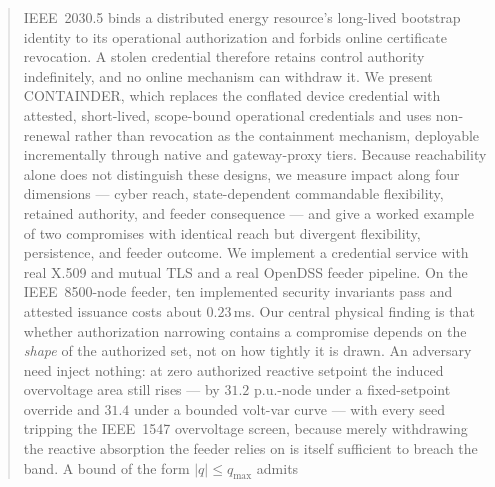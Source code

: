\begin{abstract}
IEEE~2030.5 binds a distributed energy resource's long-lived bootstrap identity to its
operational authorization and forbids online certificate revocation. A stolen credential
therefore retains control authority indefinitely, and no online mechanism can withdraw it. We
present CONTAINDER, which replaces the conflated device credential with attested, short-lived,
scope-bound operational credentials and uses non-renewal rather than revocation as the
containment mechanism, deployable incrementally through native and gateway-proxy tiers. Because
reachability alone does not distinguish these designs, we measure impact along four dimensions
--- cyber reach, state-dependent commandable flexibility, retained authority, and feeder
consequence --- and give a worked example of two compromises with identical reach but divergent
flexibility, persistence, and feeder outcome. We implement a credential service with real X.509
and mutual TLS and a real OpenDSS feeder pipeline. On the IEEE~8500-node feeder, ten implemented
security invariants pass and attested issuance costs about $0.23$\,ms. Our central physical
finding is that whether authorization narrowing contains a compromise depends on the \emph{shape}
of the authorized set, not on how tightly it is drawn. An adversary need inject nothing: at zero
authorized reactive setpoint the induced overvoltage area still rises --- by $31.2$ p.u.-node under
a fixed-setpoint override and $31.4$ under a bounded volt-var curve --- with every seed tripping
the IEEE~1547 overvoltage screen, because merely withdrawing the reactive absorption the feeder
relies on is itself sufficient to breach the band. A bound of the form $|q| \le q_{\max}$ admits

\end{abstract}
